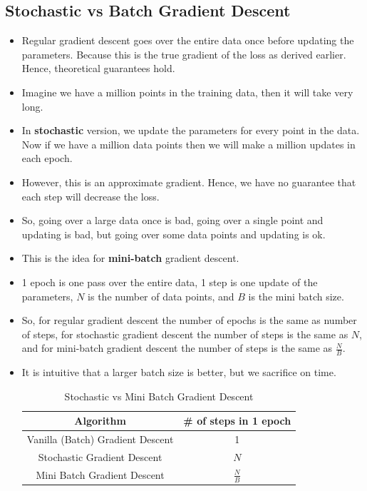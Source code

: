 \documentclass[a4paper]{article}
\begin{document}
\subsection{Stochastic vs Batch Gradient Descent}
\begin{itemize}
    \item Regular gradient descent goes over the entire data once before updating the parameters. Because this is the true gradient of the loss as derived earlier. Hence, theoretical guarantees hold.
    \item Imagine we have a million points in the training data, then it will take very long.
    \item In \textbf{stochastic} version, we update the parameters for every point in the data. Now if we have a million data points then we will make a million updates in each epoch.
    \item However, this is an approximate gradient. Hence, we have no guarantee that each step will decrease the loss.
    \item So, going over a large data once is bad, going over a single point and updating is bad, but going over some data points and updating is ok.
    \item This is the idea for \textbf{mini-batch} gradient descent.
    \item 1 epoch is one pass over the entire data, 1 step is one update of the parameters, $N$ is the number of data points, and $B$ is the mini batch size.
    \item So, for regular gradient descent the number of epochs is the same as number of steps, for stochastic gradient descent the number of steps is the same as $N$, and for mini-batch gradient descent the number of steps is the same as $\frac{N}{B}$.
    \item It is intuitive that a larger batch size is better, but we sacrifice on time.
    \begin{table}[H]
        \centering
        \begin{tabular}{|c|c|}
            \hline
            \textbf{Algorithm} & \textbf{\# of steps in 1 epoch}\\
            \hline
            Vanilla (Batch) Gradient Descent & 1 \\
            \hline
            Stochastic Gradient Descent & $N$\\
            \hline
            Mini Batch Gradient Descent & $\frac{N}{B}$\\
            \hline
        \end{tabular}
        \caption{Stochastic vs Mini Batch Gradient Descent}
        \label{tab:DL-stochastic-vs-mini-batch}
    \end{table}
\end{itemize}
\end{document}
